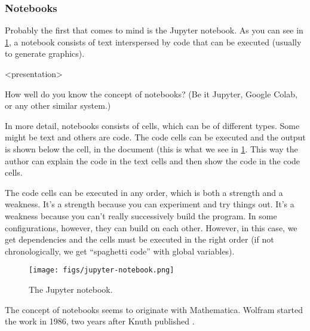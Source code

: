 \subsubsection{Notebooks}

Probably the first that comes to mind is the Jupyter notebook.
As you can see in \cref{fig:jupyter}, a notebook consists of text interspersed 
by code that can be executed (usually to generate graphics).

\begin{frame}<presentation>
\begin{activity}\label{AnalyseNotebooks}
How well do you know the concept of notebooks?
(Be it Jupyter, Google Colab, or any other similar system.)
\end{activity}
\end{frame}

In more detail, notebooks consists of cells, which can be of different types.
Some might be text and others are code.
The code cells can be executed and the output is shown below the cell, in the 
document (this is what we see in \cref{fig:jupyter}.
This way the author can explain the code in the text cells and then show the 
code in the code cells.

The code cells can be executed in any order, which is both a strength and a 
weakness.
It's a strength because you can experiment and try things out.
It's a weakness because you can't really successively build the program.
In some configurations, however, they can build on each other.
However, in this case, we get dependencies and the cells must be executed in 
the right order (if not chronologically, we get \enquote{spaghetti code} with 
global variables).

\begin{frame}
\begin{figure}[b]
  \texttt{[image: figs/jupyter-notebook.png]}
  \caption{\label{fig:jupyter}%
    The Jupyter notebook.
  }
\end{figure}
\end{frame}

\begin{frame}
\begin{remark}
  The concept of notebooks seems to originate with 
  Mathematica\autocite{Wolfram1988}.
  Wolfram started the work in 1986, two years after Knuth published 
  .
\end{remark}
\end{frame}

